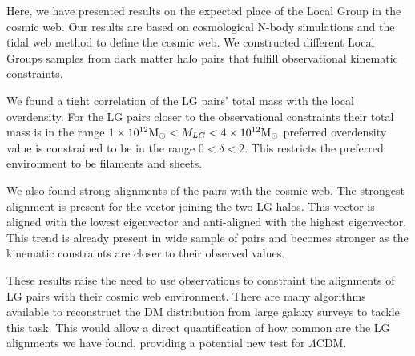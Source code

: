 \documentclass{iau}
\newcommand{\Msun}{{\ifmmode{{\rm {M_{\odot}}}}\else{${\rm{M_{\odot}}}$}\fi}}
\begin{document}
Here, we have presented results on the expected place of the Local
Group in the cosmic web. Our results are based on cosmological N-body
simulations and the tidal web method to define the cosmic web. We
constructed different Local Groups samples from dark matter halo pairs
that fulfill observational kinematic constraints. 

We found a tight correlation of the LG pairs' total mass with the
local overdensity. For the LG pairs closer to the observational
constraints their total mass is in the range $1\times 10^{12}\Msun <
M_{LG} < 4\times 10^{12}\Msun$ preferred overdensity value is
constrained to be in the range $0<\delta <2$. This restricts the
preferred environment to be filaments and sheets. 

We also found strong alignments of the pairs with the cosmic web. The
strongest alignment is present for the vector joining the two LG
halos. This vector is aligned with the lowest eigenvector and
anti-aligned with the highest eigenvector. This trend is already
present in wide sample of pairs and becomes stronger as the kinematic
constraints are closer to their observed values. 


These results  raise the need to use observations to constraint
the alignments of LG pairs with their cosmic web environment. There
are many algorithms available to reconstruct the DM distribution from
large galaxy surveys to tackle this task.  This would allow a direct
quantification of how common are the LG alignments we have found, 
providing a potential new test for $\Lambda$CDM. 




 
\end{document}
